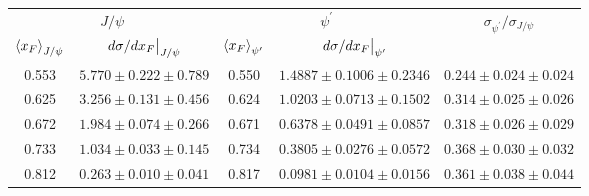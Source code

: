 \begin{tabular}{cc|cc|c}
\hline
\multicolumn{2}{c|}{$J/\psi$} &
  \multicolumn{2}{c|}{$\psi^{\prime}$} &
  \multirow{2}{*}{$\sigma_{\psi^\prime}/\sigma_{J/\psi}$} \\ \cline{1-4}
$\expval{x_F}_{J/\psi}$ &
  $\eval{d\sigma/dx_F}_{J/\psi}$ &
  $\expval{x_F}_{\psi^\prime}$ &
  $\eval{d\sigma/dx_F}_{\psi^\prime}$ &
   \\ \hline
0.553 & $5.770\pm0.222\pm0.789$ & 0.550 & $1.4887\pm0.1006\pm0.2346$ & $0.244\pm0.024\pm0.024$ \\
0.625 & $3.256\pm0.131\pm0.456$ & 0.624 & $1.0203\pm0.0713\pm0.1502$ & $0.314\pm0.025\pm0.026$ \\
0.672 & $1.984\pm0.074\pm0.266$ & 0.671 & $0.6378\pm0.0491\pm0.0857$ & $0.318\pm0.026\pm0.029$ \\
0.733 & $1.034\pm0.033\pm0.145$ & 0.734 & $0.3805\pm0.0276\pm0.0572$ & $0.368\pm0.030\pm0.032$ \\
0.812 & $0.263\pm0.010\pm0.041$ & 0.817 & $0.0981\pm0.0104\pm0.0156$ & $0.361\pm0.038\pm0.044$ \\ \hline
\end{tabular}

